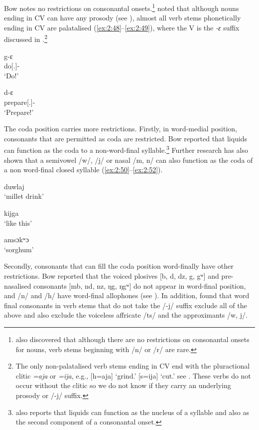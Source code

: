 Bow notes no restrictions on consonantal onsets.\footnote{\citet{FriesenMamalis2008} also discovered that although there are no restrictions on consonantal onsets for nouns, verb stems beginning with /n/ or /r/ are rare.} \cite{FriesenMamalis2008} noted that although nouns ending in CV can have any prosody (see ), almost all verb stems phonetically ending in CV are palatalised (\ref{ex:2:48}--\ref{ex:2:49}), where the V is the \textit{{}-ɛ} suffix discussed in .\footnote{The only non-palatalised verb stems ending in CV end with the pluractional clitic \textit{=aja} or \textit{=ija}, e.g., [h=aja] ‘grind.’ [s=ija] ‘cut.’ see .  These verbs do not occur without the clitic so we do not know if they carry an underlying prosody or /-j/ suffix.} 

\ea \label{ex:2:48}
 g-ɛ \\
      do[{\twoS}.{\IMP}]-{\CL}\\
\glt  ‘Do!’
\z

\ea \label{ex:2:49}
d-ɛ\\
      prepare[{\twoS}.{\IMP}]-{\CL}\\
\glt  ‘Prepare!’
\z

The coda position carries more restrictions. Firstly, in word-medial position, consonants that are permitted as coda are restricted. Bow reported that liquids can function as the coda to a non-word-final syllable.\footnote{\citealt{Bow1997c} also reports that liquids can function as the nucleus of a syllable and also as the second component of a consonantal onset.} Further research has also shown that a semivowel /w/, /j/ or nasal /m, n/ can also function as the coda of a non word-final closed syllable (\ref{ex:2:50}--\ref{ex:2:52}).

\ea \label{ex:2:50}
duwlaj\\
\glt  ‘millet drink’
\z


\ea \label{ex:2:51}
kijga\\
\glt  ‘like this’
\z

\ea \label{ex:2:52}
amsɔkʷɔ\\
\glt  ‘sorghum’
\z

Secondly, consonants that can fill the coda position word-finally have other restrictions. Bow reported that the voiced plosives [b, d, dz, g, gʷ] and pre-nasalised consonants [mb, nd, nz, ŋg, ŋgʷ] do not appear in word-final position, and /n/ and /h/ have word-final allophones (see ). In addition, \citet{FriesenMamalis2008} found that word final consonants in verb stems that do not take the /-j/ suffix exclude all of the above and also exclude the voiceless affricate /ts/ and the approximants /w, j/.  

